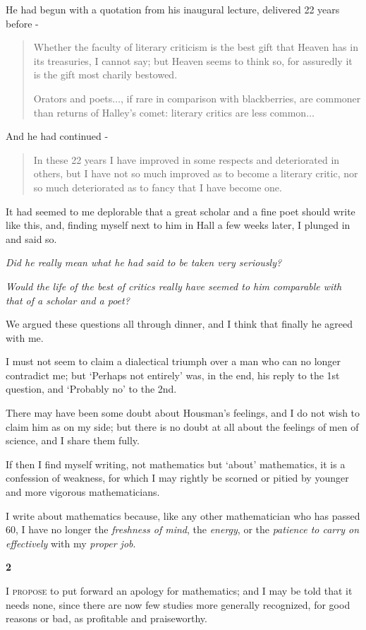 \documentclass{article}
\numberwithin{equation}{section}
\begin{document}
%
He had begun with a quotation from his inaugural lecture, delivered 22 years before -
\begin{quotation}
    Whether the faculty of literary criticism is the best gift that Heaven has in its treasuries, I cannot say; but Heaven seems to think so, for assuredly it is the gift most charily bestowed.
    
    Orators and poets$\ldots$, if rare in comparison with blackberries, are commoner than returns of Halley's comet: literary critics are less common$\ldots$
\end{quotation}
And he had continued -
\begin{quotation}
    In these 22 years I have improved in some respects and deteriorated in others, but I have not so much improved as to become a literary critic, nor so much deteriorated as to fancy that I have become one.
\end{quotation}
It had seemed to me deplorable that a great scholar and a fine poet should write like this, and, finding myself next to him in Hall a few weeks later, I plunged in and said so.

\textit{Did he really mean what he had said to be taken very seriously?}

\textit{Would the life of the best of critics really have seemed to him comparable with that of a scholar and a poet?}

We argued these questions all through dinner, and I think that finally he agreed with me.

I must not seem to claim a dialectical triumph over a man who can no longer contradict me; but `Perhaps not entirely' was, in the end, his reply to the 1st question, and `Probably no' to the 2nd.

%
There may have been some doubt about Housman's feelings, and I do not wish to claim him as on my side; but there is no doubt at all about the feelings of men of science, and I share them fully.

If then I find myself writing, not mathematics but `about' mathematics, it is a confession of weakness, for which I may rightly be scorned or pitied by younger and more vigorous mathematicians.

I write about mathematics because, like any other mathematician who has passed 60, I have no longer the \textit{freshness of mind}, the \textit{energy}, or the \textit{patience to carry on effectively} with my \textit{proper job}.

\begin{center}
    \large\textbf{2}
\end{center}
\textsc{I propose} to put forward an apology for mathematics; and I may be told that it needs none, since there are now few studies more generally recognized, for good reasons or bad, as profitable and praiseworthy.
\end{document}
